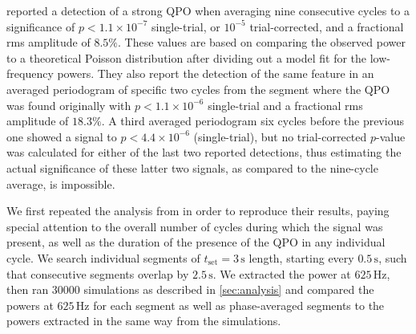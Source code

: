 \documentclass{emulateapj}
\begin{document}
\citealt{Strohmayer06} reported a detection of a strong QPO when averaging nine consecutive cycles to a significance of $p < 1.1 \times 10^{-7}$ single-trial, or $10^{-5}$ trial-corrected, and a fractional rms amplitude of $8.5\%$. These values are based on comparing the observed power to a theoretical Poisson distribution after dividing out a model fit for the low-frequency powers. They also report the detection of the same feature in an averaged periodogram of specific two cycles from the segment where the QPO was found originally with $p < 1.1 \times 10^{-6}$ single-trial and a fractional rms amplitude of $18.3\%$. A third averaged periodogram six cycles before the previous one showed a signal to $p < 4.4 \times 10^{-6}$ (single-trial), but no trial-corrected $p$-value was calculated for either of the last two reported detections, thus estimating the actual significance of these latter two signals, as compared to the nine-cycle average, is impossible.

We first repeated the analysis from \citealt{Strohmayer06} in order to reproduce their results, paying special attention to the overall number of cycles during which the signal was present, as well as the duration of the presence of the QPO in any individual cycle.
We search individual segments of $t_{\mathrm{set}} = 3 \, \mathrm{s}$ length, starting every $0.5 \, \mathrm{s}$, such that consecutive segments overlap by $2.5 \, \mathrm{s}$. We extracted the power at $625 \, \mathrm{Hz}$, then ran 30000 simulations as described in \ref{sec:analysis} and compared the powers at $625 \, \mathrm{Hz}$ for each segment as well as phase-averaged segments to the powers extracted in the same way from the simulations.
\end{document}
